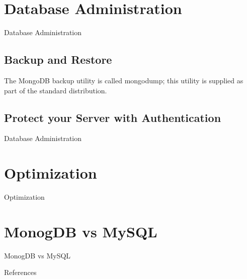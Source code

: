 \documentclass{beamer}
\begin{document}
\section{Database Administration}
\begin{frame}{Database Administration}
\subsection{Backup and Restore}
The MongoDB backup utility is called mongodump; this utility is supplied as part of the standard distribution.
\end{frame}

\subsection{Protect your Server with  Authentication}
\begin{frame}{Database Administration}
    
\end{frame}

\section{Optimization}
\begin{frame}{Optimization}
	
\end{frame}

\section{MonogDB vs MySQL}
\begin{frame}{MonogDB vs MySQL}
    
\end{frame}

\begin{frame}{References}
	\small
    
    
\end{frame}
\end{document}
